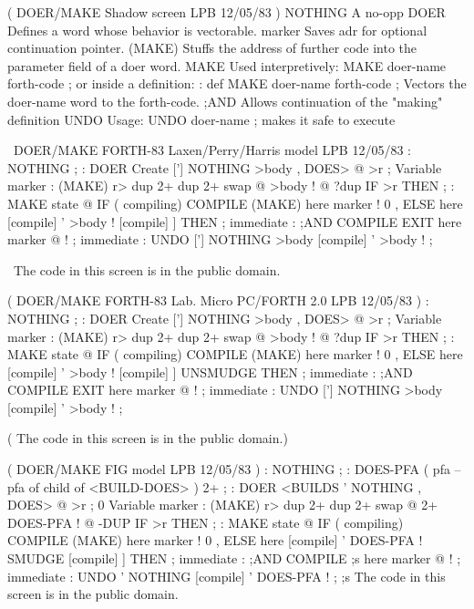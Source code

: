 \vfill
\setcounter{screen}{21}
\begin{Screen}
( DOER/MAKE   Shadow screen                      LPB 12/05/83 )
NOTHING   A no-opp
DOER      Defines a word whose behavior is vectorable.
marker    Saves adr for optional continuation pointer.
(MAKE)    Stuffs the address of further code into the
          parameter field of a doer word.
MAKE      Used interpretively:  MAKE doer-name  forth-code ;
          or inside a definition:
             : def   MAKE doer-name  forth-code ;
          Vectors the doer-name word to the forth-code.
;AND      Allows continuation of the "making" definition
UNDO      Usage:  UNDO doer-name ; makes it safe to execute




\end{Screen}
\vfill
\begin{Screen}
\ DOER/MAKE   FORTH-83 Laxen/Perry/Harris model  LPB 12/05/83 
: NOTHING ;
: DOER   Create  ['] NOTHING  >body ,  DOES> @ >r ;
Variable marker
: (MAKE)  r>  dup 2+  dup 2+  swap @  >body !
   @ ?dup IF >r THEN ;
: MAKE   state @ IF ( compiling)
   COMPILE (MAKE)  here marker !  0 ,
   ELSE  here  [compile] '  >body !
   [compile] ]  THEN ;   immediate
: ;AND   COMPILE EXIT  here marker @ ! ;   immediate
: UNDO   ['] NOTHING  >body  [compile] '  >body ! ;

\ The code in this screen is in the public domain.


\end{Screen}
\vfill
\begin{Screen}
( DOER/MAKE   FORTH-83 Lab. Micro PC/FORTH 2.0   LPB 12/05/83 )
: NOTHING ;
: DOER   Create  ['] NOTHING  >body ,  DOES> @ >r ;
Variable marker
: (MAKE)  r>  dup 2+  dup 2+  swap @  >body !
   @ ?dup IF >r THEN ;
: MAKE   state @ IF ( compiling)
   COMPILE (MAKE)  here marker !  0 ,
   ELSE  here  [compile] '  >body !
   [compile] ] UNSMUDGE  THEN ;   immediate
: ;AND   COMPILE EXIT  here marker @ ! ;   immediate
: UNDO   ['] NOTHING  >body  [compile] '  >body ! ;

( The code in this screen is in the public domain.)


\end{Screen}
\vfill
\begin{Screen}
( DOER/MAKE   FIG model                          LPB 12/05/83 )
: NOTHING   ;
: DOES-PFA  ( pfa -- pfa of child of <BUILD-DOES> )   2+ ;
: DOER   <BUILDS  ' NOTHING ,  DOES> @ >r ;
0 Variable marker
: (MAKE)  r>  dup 2+  dup 2+  swap @  2+ DOES-PFA !
   @ -DUP IF >r THEN ;
: MAKE  state @ IF ( compiling)
   COMPILE (MAKE)  here marker !  0 ,
   ELSE  here  [compile] '  DOES-PFA !
   SMUDGE    [compile] ] THEN ; immediate
: ;AND   COMPILE ;s  here marker @ ! ;  immediate
: UNDO   ' NOTHING  [compile] '  DOES-PFA ! ;
;s
The code in this screen is in the public domain.

\end{Screen}
